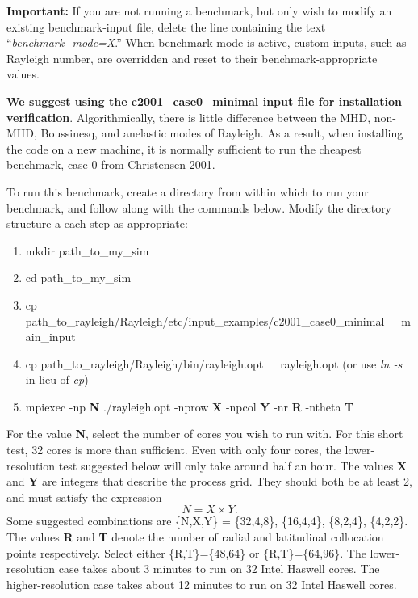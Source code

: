 \textbf{Important:}  If you are not running a benchmark, but only wish to modify an existing benchmark-input file, delete the line containing the text ``\textit{benchmark\_mode=X}.''  When benchmark mode is active, custom inputs, such as Rayleigh number, are overridden and reset to their benchmark-appropriate values.

\textbf{We suggest using the c2001\_case0\_minimal input file for installation verification}.  Algorithmically, there is little difference between the MHD, non-MHD, Boussinesq, and anelastic modes of Rayleigh.  As a result, when installing the code on a new machine, it is normally sufficient to run the cheapest benchmark, case 0 from Christensen 2001.  

To run this benchmark, create a directory from within which to run your benchmark, and follow along with the commands below.  Modify the directory structure a each step as appropriate:
\begin{enumerate}
\item mkdir {path\_to\_my\_sim}
\item cd {path\_to\_my\_sim}
\item cp {path\_to\_rayleigh/Rayleigh/etc/input\_examples/c2001\_case0\_minimal~~~main\_input}
\item cp path\_to\_rayleigh/Rayleigh/bin/rayleigh.opt~~~rayleigh.opt  (or use \textit{ln -s}  in lieu of \textit{cp})
\item mpiexec -np \textbf{N} ./rayleigh.opt -nprow \textbf{X} -npcol \textbf{Y} -nr \textbf{R} -ntheta \textbf{T}
\end{enumerate}

For the value \textbf{N}, select the number of cores you wish to run with. For this short test, 32 cores is more than sufficient.  Even with only four cores, the lower-resolution test suggested below will only take around half an hour.  The values \textbf{X} and \textbf{Y} are integers that describe the process grid.   They should both be at least 2, and must satisfy the expression 
\begin{equation}
N=X \times Y.
\end{equation}
Some suggested combinations are \{N,X,Y\} = \{32,4,8\}, \{16,4,4\}, \{8,2,4\}, \{4,2,2\}.   The values \textbf{R} and \textbf{T} denote the number of radial and latitudinal collocation points respectively.   Select either \{R,T\}=\{48,64\} or \{R,T\}=\{64,96\}.  The lower-resolution case takes about 3 minutes to run on 32 Intel Haswell cores.  The higher-resolution case takes about 12 minutes to run on 32 Intel Haswell cores.

